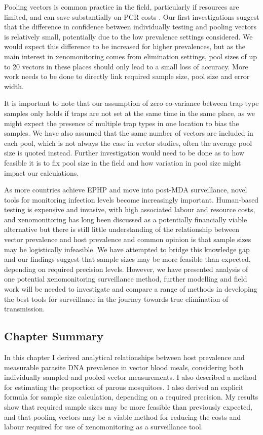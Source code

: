 Pooling vectors is common practice in the field, particularly if resources are limited, and can save substantially on PCR costs \cite{Okorie2016}. Our first investigations suggest that the difference in confidence between individually testing and pooling vectors is relatively small, potentially due to the low prevalence settings considered. We would expect this difference to be increased for higher prevalences, but as the main interest in xenomonitoring comes from elimination settings, pool sizes of up to 20 vectors in these places should only lead to a small loss of accuracy. More work needs to be done to directly link required sample size, pool size and error width. 

It is important to note that our assumption of zero co-variance between trap type samples only holds if traps are not set at the same time in the same place, as we might expect the presence of multiple trap types in one location to bias the samples. We have also assumed that the same number of vectors are included in each pool, which is not always the case in vector studies, often the average pool size is quoted instead. Further investigation would need to be done as to how feasible it is to fix pool size in the field and how variation in pool size might impact our calculations.

As more countries achieve EPHP and move into post-MDA surveillance, novel tools for monitoring infection levels become increasingly important. Human-based testing is expensive and invasive, with high associated labour and resource costs, and xenomonitoring has long been discussed as a potentially financially viable alternative but there is still little understanding of the relationship between vector prevalence and host prevalence and common opinion is that sample sizes may be logistically infeasible. We have attempted to bridge this knowledge gap and our findings suggest that sample sizes may be more feasible than expected, depending on required precision levels. However, we have presented analysis of one potential xenomonitoring surveillance method, further modelling and field work will be needed to investigate and compare a range of methods in developing the best tools for surveillance in the journey towards true elimination of transmission.

\subsection{Chapter Summary}

In this chapter I derived analytical relationships between host prevalence and measurable parasite DNA prevalence in vector blood meals, considering both individually sampled and pooled vector measurements. I also described a method for estimating the proportion of parous mosquitoes. I also derived an explicit formula for sample size calculation, depending on a required precision. My results show that required sample sizes may be more feasible than previously expected, and that pooling vectors may be a viable method for reducing the costs and labour required for use of xenomonitoring as a surveillance tool.

\FloatBarrier